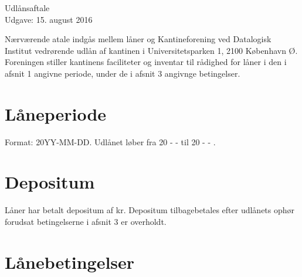 \documentclass[a4paper]{article}
\begin{document}
\begin{center}
\Huge Udlånsaftale\\
\small Udgave: 15. august 2016
\end{center}

Nærværende atale indgås mellem låner og Kantineforening ved Datalogisk Institut
vedrørende udlån af kantinen i Universitetsparken 1, 2100 København Ø.
Foreningen stiller kantinens faciliteter og inventar til rådighed for låner i
den i afsnit 1 angivne periode, under de i afsnit 3 angivnge betingelser.


\section{Låneperiode}

Format: 20YY-MM-DD.  Udlånet løber fra  20 \underline{\hspace{1cm}} -
\underline{\hspace{1cm}} - \underline{\hspace{1cm}} til 20 \underline{\hspace{1cm}} -
\underline{\hspace{1cm}} - \underline{\hspace{1cm}}.


\section{Depositum}

Låner har betalt depositum af \underline{\hspace{2cm}} kr.  Depositum
tilbagebetales efter udlånets ophør forudsat betingelserne i afsnit 3 er
overholdt.


\section{Lånebetingelser}
\end{document}
